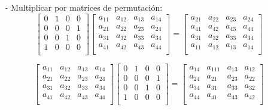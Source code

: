 \begin{itemize}
    \item[-] Multiplicar por matrices de permutación:
    \[
    \begin{bmatrix}
    0 & 1 & 0 & 0 \\
    0 & 0 & 0 & 1 \\
    0 & 0 & 1 & 0 \\
    1 & 0 & 0 & 0 \\
    \end{bmatrix}
    \begin{bmatrix}
    a_{11} & a_{12} & a_{13} & a_{14} \\
    a_{21} & a_{22} & a_{23} & a_{24} \\
    a_{31} & a_{32} & a_{33} & a_{34} \\
    a_{41} & a_{42} & a_{43} & a_{44} \\
    \end{bmatrix}
    =
    \begin{bmatrix}
    a_{21} & a_{22} & a_{23} & a_{24} \\
    a_{41} & a_{42} & a_{43} & a_{44} \\
    a_{31} & a_{32} & a_{33} & a_{34} \\
    a_{11} & a_{12} & a_{13} & a_{14} \\
    \end{bmatrix}
    \]
    
    \[
    \begin{bmatrix}
    a_{11} & a_{12} & a_{13} & a_{14} \\
    a_{21} & a_{22} & a_{23} & a_{24} \\
    a_{31} & a_{32} & a_{33} & a_{34} \\
    a_{41} & a_{42} & a_{43} & a_{44} \\
    \end{bmatrix}
    \begin{bmatrix}
    0 & 1 & 0 & 0 \\
    0 & 0 & 0 & 1 \\
    0 & 0 & 1 & 0 \\
    1 & 0 & 0 & 0 \\
    \end{bmatrix}
    =
    \begin{bmatrix}
    a_{14} & a_{111} & a_{13} & a_{12} \\
    a_{24} & a_{21} & a_{23} & a_{22} \\
    a_{34} & a_{31} & a_{33} & a_{32} \\
    a_{44} & a_{41} & a_{43} & a_{42} \\
    \end{bmatrix}
    \]
    

\end{itemize}
